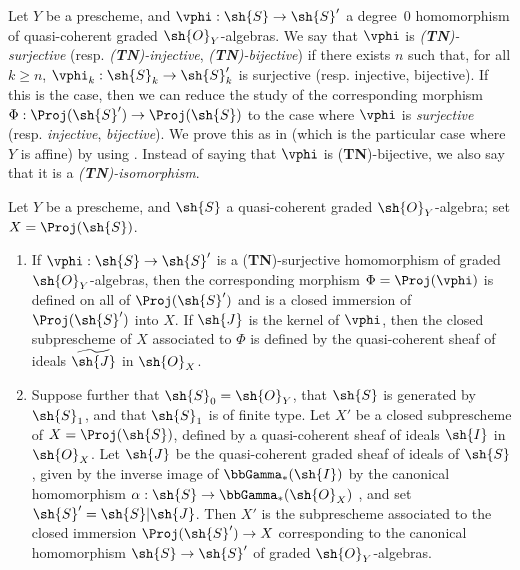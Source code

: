 \begin{env}[3.6.1]
\label{II.3.6.1}
Let $Y$ be a prescheme, and $\vphi:\sh{S}\to\sh{S}'$ a degree~$0$ homomorphism of quasi-coherent graded $\sh{O}_Y$-algebras.
We say that $\vphi$ is \emph{(\textbf{TN})-surjective} (resp. \emph{(\textbf{TN})-injective}, \emph{(\textbf{TN})-bijective}) if there exists $n$ such that, for all $k\geq n$, $\vphi_k:\sh{S}_k\to\sh{S}'_k$ is surjective (resp. injective, bijective).
If this is the case, then we can reduce the study of the corresponding morphism $\Phi:\Proj(\sh{S}')\to\Proj(\sh{S})$ to the case where $\vphi$ is \emph{surjective} (resp. \emph{injective}, \emph{bijective}).
We prove this as in  (which is the particular case where $Y$ is affine) by using .
Instead of saying that $\vphi$ is (\textbf{TN})-bijective, we also say that it is a \emph{(\textbf{TN})-isomorphism}.
\end{env}

\begin{proposition}[3.6.2]
\label{II.3.6.2}
Let $Y$ be a prescheme, and $\sh{S}$ a quasi-coherent graded $\sh{O}_Y$-algebra;
set $X=\Proj(\sh{S})$.
\begin{enumerate}
  \item[(i)] If $\vphi:\sh{S}\to\sh{S}'$ is a (\textbf{TN})-surjective homomorphism of graded $\sh{O}_Y$-algebras, then the corresponding morphism $\Phi=\Proj(\vphi)$  is defined on all of $\Proj(\sh{S}')$ and is a closed immersion of $\Proj(\sh{S}')$ into $X$.
    If $\sh{J}$ is the kernel of $\vphi$, then the closed subprescheme of $X$ associated to $\Phi$ is defined by the quasi-coherent sheaf of ideals $\widetilde{\sh{J}}$ in $\sh{O}_X$.
  \item[(ii)] Suppose further that $\sh{S}_0=\sh{O}_Y$, that $\sh{S}$ is generated by $\sh{S}_1$, and that $\sh{S}_1$ is of finite type.
    Let $X'$ be a closed subprescheme of $X=\Proj(\sh{S})$, defined by a quasi-coherent sheaf of ideals $\sh{I}$ in $\sh{O}_X$.
    Let $\sh{J}$ be the quasi-coherent graded sheaf of ideals of $\sh{S}$, given by the inverse image of $\bbGamma_*(\sh{I})$ by the canonical homomorphism $\alpha:\sh{S}\to\bbGamma_*(\sh{O}_X)$ , and set $\sh{S}'=\sh{S}|\sh{J}$.
    Then $X'$ is the subprescheme associated  to the closed immersion $\Proj(\sh{S}')\to X$ corresponding to the canonical homomorphism $\sh{S}\to\sh{S}'$ of graded $\sh{O}_Y$-algebras.
\end{enumerate}
\end{proposition}

